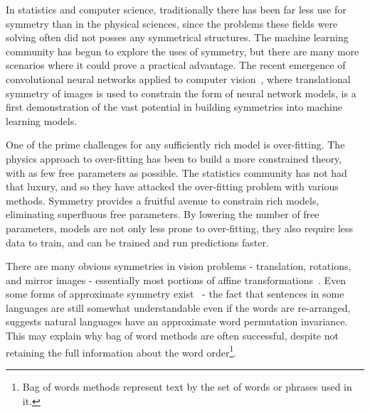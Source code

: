 \documentclass{svproc}
\begin{document}

In statistics and computer science, traditionally there has been far less use for symmetry than in the physical sciences,
since the problems these fields were solving often did not posses any symmetrical structures. The machine learning community has begun to explore the uses of symmetry, but there are many more scenarios where it could prove a practical advantage. The recent emergence of convolutional neural networks applied to computer vision~\cite{lecun1989generalization, lecun1999object, lecun1990handwritten, lecun1998gradient, krizhevsky2012imagenet, lee2009convolutional, lecun2015deep}, where translational symmetry of images is used to constrain the form of neural network models, is a first demonstration of the vast potential in building symmetries into machine learning models.


One of the prime challenges for any sufficiently rich model is over-fitting. The physics approach to over-fitting has been to build a more constrained theory, with as few free parameters as possible. The statistics community has not had that luxury, and so they have attacked the over-fitting problem with various methods. Symmetry provides a fruitful avenue to constrain rich models, eliminating superfluous free parameters. By lowering the number of free parameters, models are not only less prone to over-fitting, they also require less data to train, and can be trained and run predictions faster.


There are many obvious symmetries in vision problems - translation, rotations, and mirror images - essentially most portions of affine transformations~\cite{gens2014deep, dieleman2016exploiting, cohen2016group, henriques2016warped}. Even some forms of approximate symmetry exist~\cite{kiddonsymmetry} - the fact that sentences in some languages are still somewhat understandable even if the words are re-arranged, suggests natural languages have an approximate word permutation invariance. This may explain why bag of word methods are often successful, despite not retaining the full information about the word order\footnote{Bag of words methods represent text by the set of words or phrases used in it.}. 
\end{document}
